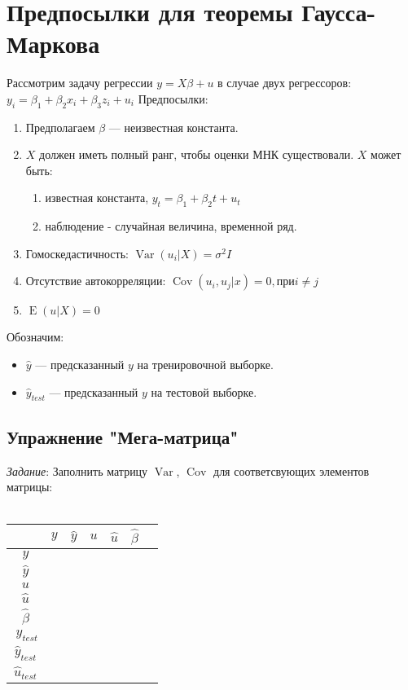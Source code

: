 \documentclass[12pt]{article} %
\theoremstyle{definition} %
\DeclareMathOperator{\Cov}{Cov}
\DeclareMathOperator{\Var}{Var}
\DeclareMathOperator{\E}{E}
\begin{document}
\section{Предпосылки для теоремы Гаусса-Маркова}
Рассмотрим задачу регрессии $y=X\beta+u$ в случае двух регрессоров: $y_i=\beta_1+\beta_2x_i+\beta_3z_i+u_i$
Предпосылки:
\begin{enumerate}
    \item Предполагаем $\beta$ — неизвестная константа.
    \item $X$ должен иметь полный ранг, чтобы оценки МНК существовали. $X$ может быть:
    \begin{enumerate}
        \item известная константа, $y_t=\beta_1+\beta_2t+u_t$
        \item наблюдение - случайная величина, временной ряд.
    \end{enumerate}
    \item Гомоскедастичность: $\Var(u_i|X)=\sigma^2I$
    \item Отсутствие автокорреляции: $\Cov(u_i,u_j|x)=0, при i\neq j$
    \item$ \E(u|X)=0$
\end{enumerate}
\quad Обозначим:
\begin{itemize}
    \item $\hat{y}$  —  предсказанный $y$ на тренировочной выборке.
    \item $\hat{y}_{test}$  —  предсказанный $y$ на тестовой выборке.
\end{itemize}





\subsection{Упражнение "Мега-матрица"}
\textit{Задание}: Заполнить матрицу $\Var$, $\Cov$ для соответсвующих элементов матрицы:
\\\\
\begin{tabular}{c||rrrrrr|}
 &$ y $& $\hat{y}$ &$ u $& $\hat{u}$ &  $\hat{\beta}$ \\
\hline
\hline
$ y $\\
$ \hat{y} $\\
$ u $\\
$ \hat{u} $\\
$ \hat{\beta} $\\
$\ y_{test}$ \\
$\hat{y}_{test}$ \\
$\hat{u}_{test}$ \\
\hline
\end{tabular}
\\\\
\end{document}
